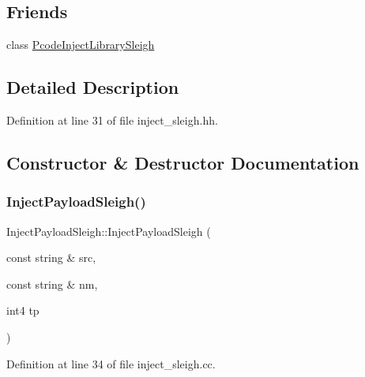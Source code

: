 \subsection*{Friends}
\begin{DoxyCompactItemize}
\item 
class \mbox{\hyperlink{class_inject_payload_sleigh_a66b43a88911f518d0a761ebd9375c30f}{Pcode\+Inject\+Library\+Sleigh}}
\end{DoxyCompactItemize}


\subsection{Detailed Description}


Definition at line 31 of file inject\+\_\+sleigh.\+hh.



\subsection{Constructor \& Destructor Documentation}
\mbox{\label{class_inject_payload_sleigh_a33e2114e7eebfa2a130b973fcfa7f549}} 
\subsubsection{\texorpdfstring{InjectPayloadSleigh()}{InjectPayloadSleigh()}}
{\footnotesize\ttfamily Inject\+Payload\+Sleigh\+::\+Inject\+Payload\+Sleigh (\begin{DoxyParamCaption}\item[{const string \&}]{src,  }\item[{const string \&}]{nm,  }\item[{int4}]{tp }\end{DoxyParamCaption})}



Definition at line 34 of file inject\+\_\+sleigh.\+cc.

\mbox{\label{class_inject_payload_sleigh_a5efb145e9099025fed51e339a09f3679}} 
